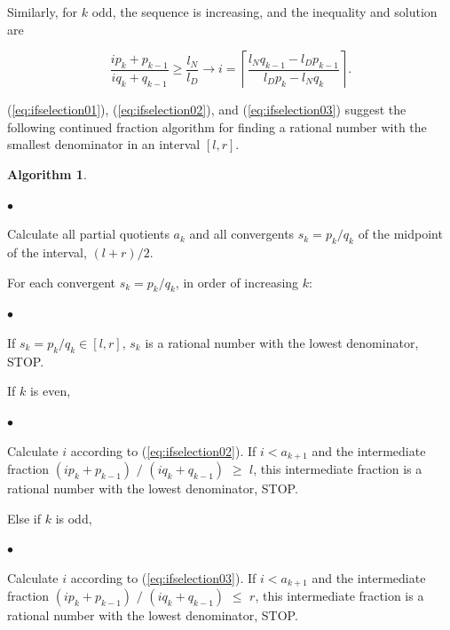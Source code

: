 \documentclass{esub2acm}
\newtheorem{algorithm}{Algorithm}
\newenvironment{alglvl0}{\begin{list}
               {$\bullet$}{\setlength{\labelwidth}{3mm}\setlength{\leftmargin}{6mm}}}
               {\end{list}}
\newenvironment{alglvl1}{\begin{list}
               {$\bullet$}{\setlength{\labelwidth}{3mm}\setlength{\leftmargin}{6mm}}}
               {\end{list}}
\newenvironment{alglvl2}{\begin{list}
               {$\bullet$}{\setlength{\labelwidth}{3mm}\setlength{\leftmargin}{6mm}}}
               {\end{list}}
\begin{document}
Similarly, for $k$ odd, the sequence is increasing,
and the inequality and solution are

\begin{equation}
\label{eq:ifselection03}
\frac{i p_k + p_{k-1}}{i q_k + q_{k-1}} \geq \frac{l_N}{l_D}
\to
i = \left\lceil {
\frac{l_N q_{k-1} - l_D p_{k-1}}{l_D p_k - l_N q_k}
} \right\rceil .
\end{equation}

(\ref{eq:ifselection01}),
(\ref{eq:ifselection02}),
and (\ref{eq:ifselection03}) suggest the following continued fraction
algorithm for finding
a rational number with the smallest denominator in an
interval $[l,r]$.

\begin{algorithm}\label{alg:cfmindenominator}\end{algorithm}
\begin{alglvl0}
\item Calculate all partial quotients $a_k$ and all convergents
      $s_k = p_k/q_k$ of the midpoint of the interval,
      $(l+r)/2$.

\item  For each convergent $s_k=p_k/q_k$, in order of increasing $k$:

   \begin{alglvl1}

   \item If $s_k = p_k/q_k \in [l,r]$, $s_k$ is a rational number with
         the lowest denominator, STOP.

   \item If $k$ is even,

      \begin{alglvl2}

      \item Calculate $i$ according to (\ref{eq:ifselection02}).
            If $i < a_{k+1}$ and the intermediate fraction
            $(i p_k + p_{k-1})$ $/$ $(i q_k + q_{k-1})$ $\geq$ $l$, this intermediate
            fraction is
            a rational number with the lowest denominator, STOP.

      \end{alglvl2}

   \item Else if $k$ is odd,

      \begin{alglvl2}

      \item Calculate $i$ according to (\ref{eq:ifselection03}).
            If $i < a_{k+1}$ and the intermediate fraction
            $(i p_k + p_{k-1})$ $/$ $(i q_k + q_{k-1})$ $\leq$ $r$, this intermediate
            fraction is
            a rational number with the lowest denominator, STOP.

      \end{alglvl2}

   \end{alglvl1}

\end{alglvl0}
\end{document}
